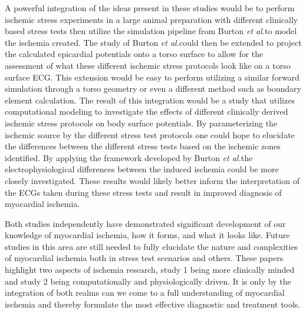 \documentclass[12pt]{article}
\newcommand{\etal}{{\em et al.}}
\begin{document}
A powerful integration of the ideas present in these studies would be to perform ischemic stress experiments in a large animal preparation with different clinically based stress tests then utilize the simulation pipeline from Burton \etal to model the ischemia created. The study of Burton \etal could then be extended to project the calculated epicardial potentials onto a torso surface to allow for the assessment of what these different ischemic stress protocols look like on a torso surface ECG. This extension would be easy to perform utilizing a similar forward simulation through a torso geometry or even a different method such as boundary element calculation. The result of this integration would be a study that utilizes computational modeling to investigate the effects of different clinically derived ischemic stress protocols on body surface potentials. By parameterizing the ischemic source by the different stress test protocols one could hope to elucidate the differences between the different stress tests based on the ischemic zones identified. By applying the framework developed by Burton \etal the electrophysiological differences between the induced ischemia could be more closely investigated. These results would likely better inform the interpretation of the ECGs taken during these stress tests and result in improved diagnosis of myocardial ischemia.

Both studies independently have demonstrated significant development of our knowledge of myocardial ischemia, how it forms, and what it looks like. Future studies in this area are still needed to fully elucidate the nature and complexities of myocardial ischemia both in stress test scenarios and others. These papers highlight two aspects of ischemia research, study 1 being more clinically minded and study 2 being computationally and physiologically driven. It is only by the integration of both realms can we come to a full understanding of myocardial ischemia and thereby formulate the most effective diagnostic and treatment tools.





\end{document}
